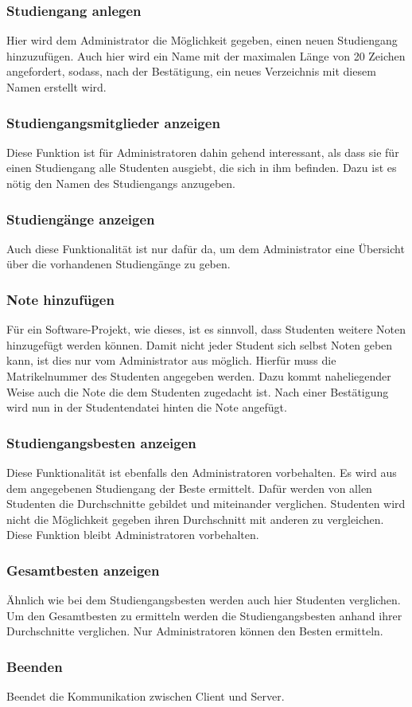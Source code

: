 \documentclass{scrartcl}
\begin{document}
		\subsubsection{Studiengang anlegen}
			Hier wird dem Administrator die Möglichkeit gegeben, einen neuen Studiengang hinzuzufügen. Auch hier wird ein Name mit der maximalen Länge von 20 Zeichen angefordert, sodass, nach der Bestätigung, ein neues Verzeichnis mit diesem Namen erstellt wird.
		\subsubsection{Studiengangsmitglieder anzeigen}
			Diese Funktion ist für Administratoren dahin gehend interessant, als dass sie für einen Studiengang alle Studenten ausgiebt, die sich in ihm befinden. Dazu ist es nötig den Namen des Studiengangs anzugeben.
		\subsubsection{Studiengänge anzeigen}
			Auch diese Funktionalität ist nur dafür da, um dem Administrator eine Übersicht über die vorhandenen Studiengänge zu geben. 
		\subsubsection{Note hinzufügen}
			Für ein Software-Projekt, wie dieses, ist es sinnvoll, dass Studenten weitere Noten hinzugefügt werden können. Damit nicht jeder Student sich selbst Noten geben kann, ist dies nur vom Administrator aus möglich. Hierfür muss die Matrikelnummer des Studenten angegeben werden. Dazu kommt naheliegender Weise auch die Note die dem Studenten zugedacht ist. Nach einer Bestätigung wird nun in der Studentendatei hinten die Note angefügt.
		\subsubsection{Studiengangsbesten anzeigen}
			Diese Funktionalität ist ebenfalls den Administratoren vorbehalten. Es wird aus dem angegebenen Studiengang der Beste ermittelt. Dafür werden von allen Studenten die Durchschnitte gebildet und miteinander verglichen. Studenten wird nicht die Möglichkeit gegeben ihren Durchschnitt mit anderen zu vergleichen. Diese Funktion bleibt Administratoren vorbehalten.
		\subsubsection{Gesamtbesten anzeigen}
			Ähnlich wie bei dem Studiengangsbesten werden auch hier Studenten verglichen. Um den Gesamtbesten zu ermitteln werden die Studiengangsbesten anhand ihrer Durchschnitte verglichen. Nur Administratoren können den Besten ermitteln.
		\subsubsection{Beenden}
			Beendet die Kommunikation zwischen Client und Server. 
\end{document}
